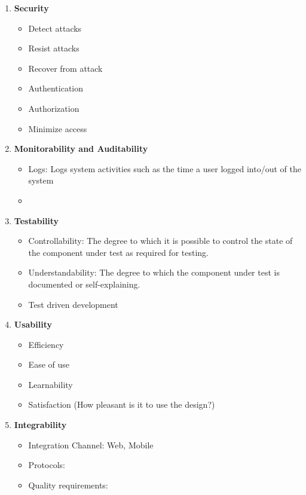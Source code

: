 \documentclass[]{report}
\begin{document}
\begin{enumerate}
	\item \textbf{Security}
	\begin{itemize}
		\item Detect attacks 
		\item Resist attacks
		\item Recover from attack
		\item Authentication
		\item Authorization
		\item Minimize access
	\end{itemize}
	
	\item \textbf{Monitorability and Auditability}
	\begin{itemize}
		\item Logs: Logs system activities such as the time a user logged into/out of the system
		\item 
	\end{itemize}
	
	\item \textbf{Testability}
	\begin{itemize}
		\item Controllability: The degree to which it is possible to control the state of the component under test as required for testing.
		\item Understandability: The degree to which the component under test is documented or self-explaining.
		\item Test driven development
	\end{itemize}
	
	\item \textbf{Usability}
	\begin{itemize}
		\item Efficiency
		\item Ease of use
		\item Learnability
		\item Satisfaction (How pleasant is it to use the design?)
	\end{itemize}
	
	\item \textbf{Integrability}
	\begin{itemize}
		\item Integration Channel: Web, Mobile
		\item Protocols: 
		\item Quality requirements: 
	\end{itemize}
	
\end{enumerate}
\end{document}
